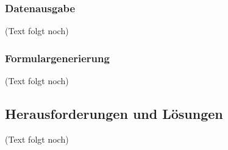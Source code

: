     \subsubsection{Datenausgabe}

	(Text folgt noch)

    \subsubsection{Formulargenerierung}

	(Text folgt noch)

  \subsection{Herausforderungen und Lösungen}

	(Text folgt noch)
